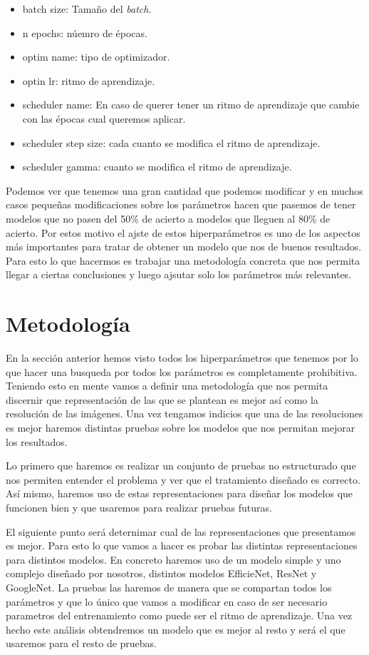 \documentclass[a4paper,12pt,twoside,titlepage]{article}
\begin{document}
\begin{itemize}
  \item batch size: Tamaño del \textit{batch}.
  \item n epochs: núemro de épocas.
  \item optim name: tipo de optimizador.
  \item optin lr: ritmo de aprendizaje.
  \item scheduler name: En caso de querer tener un ritmo de aprendizaje que cambie con las épocas cual queremos aplicar.
  \item scheduler step size: cada cuanto se modifica el ritmo de aprendizaje.
  \item scheduler gamma: cuanto se modifica el ritmo de aprendizaje.
\end{itemize}


Podemos ver que tenemos una gran cantidad que podemos modificar y en muchos casos pequeñas modificaciones sobre los parámetros hacen que pasemos de tener modelos que no pasen del 50\% de acierto a modelos que lleguen al 80\% de acierto. Por estos motivo el ajste de estos hiperparámetros es uno de los aspectos más importantes para tratar de obtener un modelo que nos de buenos resultados. Para esto lo que hacermos es trabajar una metodología concreta que nos permita llegar a ciertas conclusiones y luego ajsutar solo los parámetros más relevantes.

\section{Metodología}

En la sección anterior hemos visto todos los hiperparámetros que tenemos por lo que hacer una busqueda por todos los parámetros es completamente prohibitiva. Teniendo esto en mente vamos a definir una metodología que nos permita discernir que representación de las que se plantean es mejor así como la resolución de las imágenes. Una vez tengamos indicios que una de las resoluciones es mejor haremos distintas pruebas sobre los modelos que nos permitan mejorar los resultados.

Lo primero que haremos es realizar un conjunto de pruebas no estructurado que nos permiten entender el problema y ver que el tratamiento diseñado es correcto. Así mismo, haremos uso de estas representaciones para diseñar los modelos que funcionen bien y que usaremos para realizar pruebas futuras.

El siguiente punto será deternimar cual de las representaciones que presentamos es mejor. Para esto lo que vamos a hacer es probar las distintas representaciones para distintos modelos. En concreto haremos uso de un modelo simple y uno complejo diseñado por nosotros, distintos modelos EfficieNet, ResNet y GoogleNet. La pruebas las haremos de manera que se compartan todos los parámetros y que lo único que vamos a modificar en caso de ser necesario parametros del entrenamiento como puede ser el ritmo de aprendizaje. Una vez hecho este análisis obtendremos un modelo que es mejor al resto y será el que usaremos para el resto de pruebas. 
\end{document}

